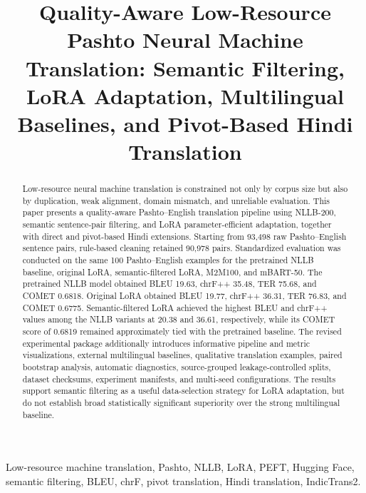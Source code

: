 \documentclass[conference]{IEEEtran}
\begin{document}
\title{
Quality-Aware Low-Resource Pashto Neural Machine Translation:
Semantic Filtering, LoRA Adaptation, Multilingual Baselines,
and Pivot-Based Hindi Translation
}

\author{
}

\maketitle

\begin{abstract}
Low-resource neural machine translation is constrained not
only by corpus size but also by duplication, weak alignment,
domain mismatch, and unreliable evaluation. This paper
presents a quality-aware Pashto--English translation pipeline
using NLLB-200, semantic sentence-pair filtering, and LoRA
parameter-efficient adaptation, together with direct and
pivot-based Hindi extensions. Starting from 93,498 raw
Pashto--English sentence pairs, rule-based cleaning retained
90,978 pairs. Standardized evaluation was conducted on the
same 100 Pashto--English examples for the
pretrained NLLB baseline, original LoRA, semantic-filtered
LoRA, M2M100, and mBART-50. The pretrained NLLB model
obtained BLEU 19.63, chrF++ 35.48,
TER 75.68, and COMET 0.6818.
Original LoRA obtained BLEU 19.77,
chrF++ 36.31, TER
76.83, and COMET
0.6775. Semantic-filtered LoRA achieved
the highest BLEU and chrF++ values among the NLLB variants
at 20.38 and 36.61,
respectively, while its COMET score of
0.6819 remained approximately tied
with the pretrained baseline. The revised experimental
package additionally introduces informative pipeline and
metric visualizations, external multilingual baselines,
qualitative translation examples, paired bootstrap analysis,
automatic diagnostics, source-grouped leakage-controlled
splits, dataset checksums, experiment manifests, and
multi-seed configurations. The results support semantic
filtering as a useful data-selection strategy for LoRA
adaptation, but do not establish broad statistically
significant superiority over the strong multilingual baseline.
\end{abstract}

\begin{IEEEkeywords}
Low-resource machine translation, Pashto, NLLB, LoRA, PEFT, Hugging Face, semantic filtering, BLEU, chrF, pivot translation, Hindi translation, IndicTrans2.
\end{IEEEkeywords}
\end{document}
